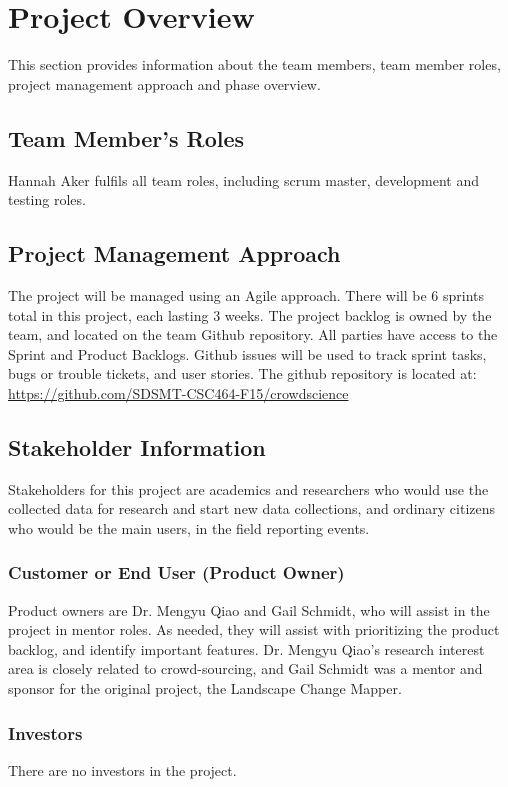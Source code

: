 

\chapter{Project Overview}
This section provides information about the team members, team member roles, project management approach and phase overview.

\section{Team Member's Roles}
Hannah Aker fulfils all team roles, including scrum master, development and testing roles.

\section{Project  Management Approach}
The project will be managed using an Agile approach.  There will be 6 sprints total in this project, each lasting 3 weeks. The project backlog is owned by the team, and located on the team Github repository. All parties have access to the Sprint and Product Backlogs. Github issues will be used to track sprint tasks, bugs or trouble tickets, and user stories. The github repository is located at: \url{https://github.com/SDSMT-CSC464-F15/crowdscience} 


\section{ Stakeholder Information}
Stakeholders for this project are academics and researchers who would use the collected data for research and start new data collections, and ordinary citizens who would be the main users, in the field reporting events. 


\subsection{Customer or End User (Product Owner)}
Product owners are Dr. Mengyu Qiao and Gail Schmidt, who will assist in the project in mentor roles. As needed, they will assist with prioritizing the product backlog, and identify important features. Dr. Mengyu Qiao's research interest area is closely related to crowd-sourcing, and Gail Schmidt was a mentor and sponsor for the original project, the Landscape Change Mapper.

\subsection{Investors}
There are no investors in the project.

